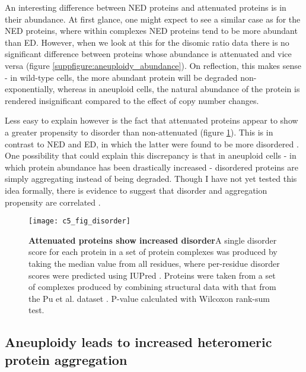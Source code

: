 \documentclass[a4paper,11pt,twoside,openright]{scrbook}
\begin{document}
An interesting difference between NED proteins and attenuated proteins is in their abundance. At first glance, one might expect to see a similar case as for the NED proteins, where within complexes NED proteins tend to be more abundant than ED. However, when we look at this for the disomic ratio data there is no significant difference between proteins whose abundance is attenuated and vice versa (figure \ref{suppfigure:aneuploidy_abundance}). On reflection, this makes sense - in wild-type cells, the more abundant protein will be degraded non-exponentially, whereas in aneuploid cells, the natural abundance of the protein is rendered insignificant compared to the effect of copy number changes.

Less easy to explain however is the fact that attenuated proteins appear to show a greater propensity to disorder than non-attenuated (figure \ref{figure:aneuploidy_disorder}). This is in contrast to NED and ED, in which the latter were found to be more disordered \cite{McShane2016}. One possibility that could explain this discrepancy is that in aneuploid cells - in which protein abundance has been drastically increased - disordered proteins are simply aggregating instead of being degraded. Though I have not yet tested this idea formally, there is evidence to suggest that disorder and aggregation propensity are correlated \cite{Carvalho2013}.

\begin{figure}[h]
\fcapsideright
    {\caption[Attenuated proteins show increased disorder]{\sffamily\textbf{Attenuated proteins show increased disorder}\newline \small A single disorder score for each protein in a set of protein complexes was produced by taking the median value from all residues, where per-residue disorder scores were predicted using IUPred \cite{Dosztanyi2005}. Proteins were taken from a set of complexes produced by combining structural data with that from the Pu et al. dataset \cite{Pu2009}. P-value calculated with Wilcoxon rank-sum test.}\label{figure:aneuploidy_disorder}}
    {\texttt{[image: c5\_fig\_disorder]}}
\end{figure}

\subsection{Aneuploidy leads to increased heteromeric protein aggregation}
\end{document}
